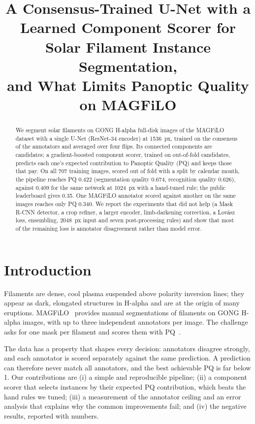 \documentclass[conference]{IEEEtran}
\begin{document}
\title{A Consensus-Trained U-Net with a Learned Component Scorer for Solar Filament Instance Segmentation,\\and What Limits Panoptic Quality on MAGFiLO}

\author{
}

\maketitle

\begin{abstract}
We segment solar filaments on GONG H-alpha full-disk images of the MAGFiLO dataset with a single U-Net
(ResNet-34 encoder) at 1536~px, trained on the consensus of the annotators and averaged over four flips.
Its connected components are candidates; a gradient-boosted component scorer, trained on out-of-fold
candidates, predicts each one's expected contribution to Panoptic Quality (PQ) and keeps those that pay.
On all 707 training images, scored out of fold with a split by calendar month, the pipeline reaches PQ
0.422 (segmentation quality 0.674, recognition quality 0.626), against 0.409 for the same network at
1024~px with a hand-tuned rule; the public leaderboard gives 0.35. One MAGFiLO annotator scored against
another on the same images reaches only PQ 0.340. We report the experiments that did not help (a Mask
R-CNN detector, a crop refiner, a larger encoder, limb-darkening correction, a Lov\'asz loss, ensembling,
2048~px input and seven post-processing rules) and show that most of the remaining loss is annotator
disagreement rather than model error.
\end{abstract}

\section{Introduction}
Filaments are dense, cool plasma suspended above polarity inversion lines; they appear as dark, elongated
structures in H-alpha and are at the origin of many eruptions. MAGFiLO~\cite{magfilo} provides manual
segmentations of filaments on GONG H-alpha images, with up to three independent annotators per image.
The challenge~\cite{challenge} asks for one mask per filament and scores them with PQ~\cite{kirillov2019}.

The data has a property that shapes every decision: annotators disagree strongly, and each annotator is
scored separately against the same prediction. A prediction can therefore never match all annotators,
and the best achievable PQ is far below 1. Our contributions are (i) a simple and reproducible
pipeline; (ii) a component scorer that selects instances by their expected PQ contribution, which beats
the hand rules we tuned; (iii) a measurement of the annotator ceiling and an error analysis that
explains why the common improvements fail; and (iv) the negative results, reported with numbers.
\end{document}
